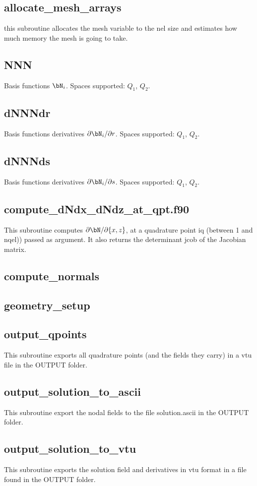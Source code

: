  \subsection{allocate\_mesh\_arrays}
 this subroutine allocates the mesh variable to the nel size 
 and estimates how much memory the mesh is going to take.
 \subsection{NNN}
 Basis functions ${\bN}_i$. Spaces supported: $Q_1$, $Q_2$.
 \subsection{dNNNdr}
 Basis functions derivatives $\partial{\bN}_i/\partial r$. Spaces supported: $Q_1$, $Q_2$.
 \subsection{dNNNds}
 Basis functions derivatives $\partial{\bN}_i/\partial s$. Spaces supported: $Q_1$, $Q_2$.
 \subsection{compute\_dNdx\_dNdz\_at\_qpt.f90}
 This subroutine computes $\partial{\bN}/\partial \{x,z\}$, 
 at a quadrature point iq (between 1 and nqel)) passed as argument.
 It also returns the determinant jcob of the Jacobian matrix.
 \subsection{compute\_normals}

 \subsection{geometry\_setup}

 \subsection{output\_qpoints}
 This subroutine exports all quadrature points (and the fields they carry)
 in a vtu file in the OUTPUT folder.
 \subsection{output\_solution\_to\_ascii}
 This subroutine export the nodal fields to the file {solution.ascii} in the OUTPUT folder.
 \subsection{output\_solution\_to\_vtu}
 This subroutine exports the solution field and derivatives in vtu format in a file found in 
 the OUTPUT folder. 

